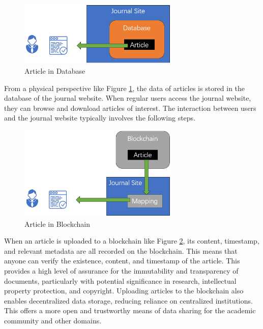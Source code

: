 \documentclass[lettersize,journal]{IEEEtran}
\begin{document}
\begin{figure}[h]
  \centering
  \includegraphics[width=3in]{assets/journalsite.png}
  \caption{Article in Database}
  \label{fig:journalsite}
\end{figure}

From a physical perspective like Figure \ref{fig:journalsite}, the data of articles is stored in the database of the journal website. When regular users access the journal website, they can browse and download articles of interest. The interaction between users and the journal website typically involves the following steps.


\begin{figure}[h]
  \centering
  \includegraphics[width=3in]{assets/journalchain.png}
  \caption{Article in Blockchain}
  \label{fig:journalchain}
\end{figure}

When an article is uploaded to a blockchain like Figure \ref{fig:journalchain}, its content, timestamp, and relevant metadata are all recorded on the blockchain. This means that anyone can verify the existence, content, and timestamp of the article. This provides a high level of assurance for the immutability and transparency of documents, particularly with potential significance in research, intellectual property protection, and copyright. Uploading articles to the blockchain also enables decentralized data storage, reducing reliance on centralized institutions. This offers a more open and trustworthy means of data sharing for the academic community and other domains.
\end{document}
